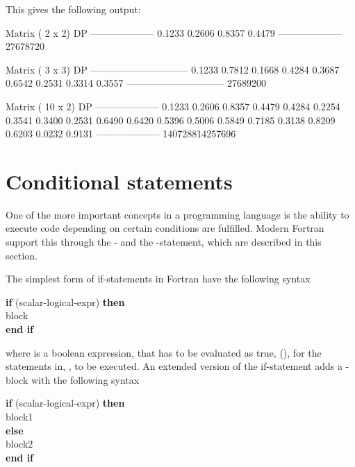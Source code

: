 This gives the following output:

\begin{fortrancodeenv}
Matrix (  2 x   2) DP
--------------------
    0.1233    0.2606
    0.8357    0.4479
--------------------
             27678720

Matrix (  3 x   3) DP
------------------------------
    0.1233    0.7812    0.1668
    0.4284    0.3687    0.6542
    0.2531    0.3314    0.3557
------------------------------
             27689200

Matrix ( 10 x   2) DP
--------------------
    0.1233    0.2606
    0.8357    0.4479
    0.4284    0.2254
    0.3541    0.3400
    0.2531    0.6490
    0.6420    0.5396
    0.5006    0.5849
    0.7185    0.3138
    0.8209    0.6203
    0.0232    0.9131
--------------------
      140728814257696
\end{fortrancodeenv}

\section{Conditional statements}

One of the more important concepts in a programming language is the ability to execute code depending on certain conditions are fulfilled. Modern Fortran support this through the - and the -statement, which are described in this section.

The simplest form of if-statements in Fortran have the following syntax

\begin{fsyntax}
\textbf{if} (scalar-logical-expr) \textbf{then}\\
\ftab  block\\
\textbf{end if}\\
\end{fsyntax}

where  is a boolean expression, that has to be evaluated as true, (), for the statements in, , to be executed. An extended version of the if-statement adds a -block with the following syntax

\begin{fsyntax}
\textbf{if} (scalar-logical-expr) \textbf{then}\\
\ftab block1\\
\textbf{else}\\
\ftab block2\\
\textbf{end if}\\
\end{fsyntax}

